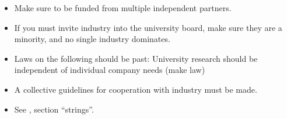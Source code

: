 \documentclass[draft,11pt,openright,monochrome,british,a4paper]{scrartcl}
\begin{document}
\begin{itemize}
\begin{itemize}
  \item Make sure to be funded from multiple independent partners.
  \item If you must invite industry into the university board, make
    sure they are a minority, and no single industry dominates.
  \item Laws on the following should be past: University research should be independent of individual
    company needs (make law)
  \item A collective guidelines for cooperation with industry must
    be made.
  \item See \cite{pain2008}, section ``strings''.
  \end{itemize}
\end{itemize}




\end{document}
